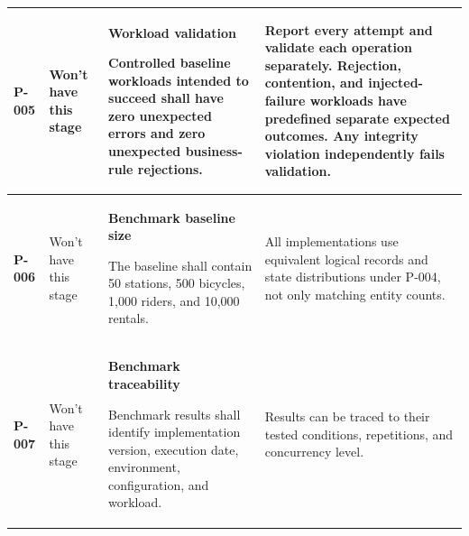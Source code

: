 \documentclass[10pt,a4paper,landscape]{article}
\newcommand{\reqtitle}[1]{{\fontsize{11}{13}\selectfont\bfseries #1}\par\nobreak\vspace{2pt}\noindent}
\begin{document}
\begin{longtable}{|C{27mm}|C{25mm}|L{79mm}|L{111mm}|}
\textbf{P-005} & Won't have this stage & \reqtitle{Workload validation}Controlled baseline workloads intended to succeed shall have zero unexpected errors and zero unexpected business-rule rejections. & Report every attempt and validate each operation separately. Rejection, contention, and injected-failure workloads have predefined separate expected outcomes. Any integrity violation independently fails validation. \\\hline

\textbf{P-006} & Won't have this stage & \reqtitle{Benchmark baseline size}The baseline shall contain 50 stations, 500 bicycles, 1,000 riders, and 10,000 rentals. & All implementations use equivalent logical records and state distributions under P-004, not only matching entity counts. \\\hline

\textbf{P-007} & Won't have this stage & \reqtitle{Benchmark traceability}Benchmark results shall identify implementation version, execution date, environment, configuration, and workload. & Results can be traced to their tested conditions, repetitions, and concurrency level. \\\hline

\end{longtable}
\endgroup

\end{document}
